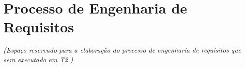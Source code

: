 \section{Processo de Engenharia de Requisitos}
	\textit{(Espaço reservado para a elaboração do processo de engenharia de requisitos que sera executado em T2.)}